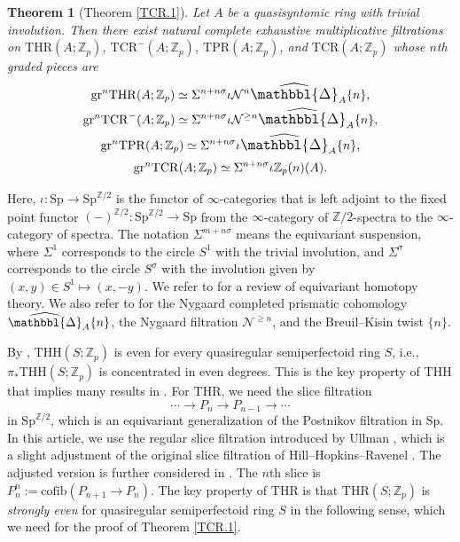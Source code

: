 \documentclass[10pt]{amsart}
\newtheorem{thm}{Theorem}[section]
\theoremstyle{definition}
\numberwithin{equation}{section}
\newcommand{\Z}{\mathbb{Z}}
\newcommand{\cN}{\mathcal{N}}
\newcommand{\prism}{{\mathlarger{\mathbbl{\Delta}}}}
\newcommand{\Sp}{\mathrm{Sp}}
\newcommand{\cofib}{\mathrm{cofib}}
\newcommand{\gr}{\mathrm{gr}}
\newcommand{\THH}{\mathrm{THH}}
\newcommand{\TPR}{\mathrm{TPR}}
\newcommand{\THR}{\mathrm{THR}}
\newcommand{\TCR}{\mathrm{TCR}}
\begin{document}
\begin{thm}[Theorem \ref{TCR.1}]
\label{intro.1}
Let $A$ be a quasisyntomic ring with trivial involution.
Then there exist natural complete exhaustive multiplicative filtrations on $\THR(A;\Z_p)$, $\TCR^-(A;\Z_p)$, $\TPR(A;\Z_p)$, and $\TCR(A;\Z_p)$ whose $n$th graded pieces are
\begin{gather*}
\gr^n \THR(A;\Z_p)
\simeq
\Sigma^{n+n\sigma}
\iota \cN^n  \widehat{\prism}_A\{n\},
\\
\gr^n \TCR^-(A;\Z_p)
\simeq
\Sigma^{n+n\sigma}
\iota \cN^{\geq n} \widehat{\prism}_A\{n\},
\\
\gr^n \TPR(A;\Z_p)
\simeq
\Sigma^{n+n\sigma}
\iota \widehat{\prism}_A\{n\},
\\
\gr^n \TCR(A;\Z_p)
\simeq
\Sigma^{n+n\sigma}
\iota \Z_p(n)(A).
\end{gather*}
\end{thm}

Here,
$\iota \colon \Sp\to \Sp^{\Z/2}$ is the functor of $\infty$-categories that is left adjoint to the fixed point functor $(-)^{\Z/2}\colon \Sp^{\Z/2}\to \Sp$ from the $\infty$-category of $\Z/2$-spectra to the $\infty$-category of spectra.
The notation $\Sigma^{m+n\sigma}$ means the equivariant suspension,
where $\Sigma^1$ corresponds to the circle $S^1$ with the trivial involution, and $\Sigma^\sigma$ corresponds to the circle $S^\sigma$ with the involution given by $(x,y)\in S^1\mapsto (x,-y)$.
We refer to \cite[\S A]{HP23} for a review of equivariant homotopy theory.
We also refer to \cite[Theorem 1.12]{BMS19} for the Nygaard completed prismatic cohomology $\widehat{\prism}_A\{n\}$, the Nygaard filtration $\cN^{\geq n}$, and the Breuil--Kisin twist $\{n\}$.



\medskip

By \cite[Theorem 7.1(1)]{BMS19},
$\THH(S;\Z_p)$ is even for every quasiregular semiperfectoid ring $S$, i.e., $\pi_{*}\THH(S;\Z_p)$ is concentrated in even degrees.
This is the key property of $\THH$ that implies many results in \cite[\S 7]{BMS19}.
For $\THR$,
we need the slice filtration
\[
\cdots \to P_n \to  P_{n-1}\to \cdots
\]
in $\Sp^{\Z/2}$,
which is an equivariant generalization of the Postnikov filtration in $\Sp$.
In this article,
we use the regular slice filtration introduced by Ullman \cite{Ull13},
which is a slight adjustment of the original slice filtration of Hill--Hopkins--Ravenel \cite{HHR}.
The adjusted version is further considered in \cite{HHR21}.
The $n$th slice is $P_n^n:=\cofib(P_{n+1}\to P_n)$.
The key property of $\THR$ is that $\THR(S;\Z_p)$ is \emph{strongly even} for quasiregular semiperfectoid ring $S$ in the following sense,
which we need for the proof of Theorem \ref{TCR.1}.
\end{document}
